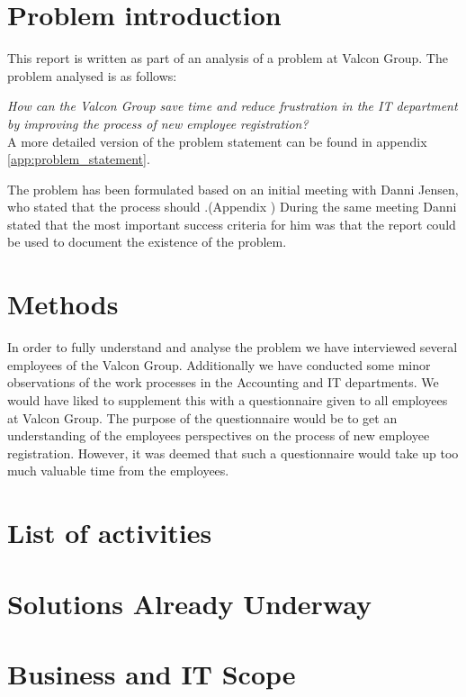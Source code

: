 \section{Problem introduction}
This report is written as part of an analysis of a problem at Valcon Group.
The problem analysed is as follows:

\emph{How can the Valcon Group save time and reduce frustration in the IT department by improving the process of new employee registration?}
\\
A more detailed version of the problem statement can be found in appendix \ref{app:problem_statement}.

The problem has been formulated based on an initial meeting with Danni Jensen, who stated that the process should .(Appendix )
During the same meeting Danni stated that the most important success criteria for him was that the report could be used to document the existence of the problem.

\section{Methods}
In order to fully understand and analyse the problem we have interviewed several employees of the Valcon Group.
Additionally we have conducted some minor observations of the work processes in the Accounting and IT departments.
We would have liked to supplement this with a questionnaire given to all employees at Valcon Group.
The purpose of the questionnaire would be to get an understanding of the employees perspectives on the process of new employee registration.
However, it was deemed that such a questionnaire would take up too much valuable time from the employees.
\section{List of activities}


\section{Solutions Already Underway}


\section{Business and IT Scope}


